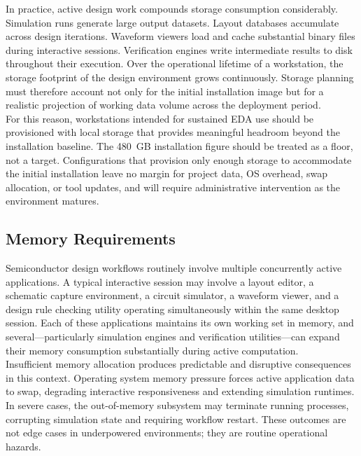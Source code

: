 In practice, active design work compounds storage consumption considerably. Simulation runs
generate large output datasets. Layout databases accumulate across design iterations. Waveform
viewers load and cache substantial binary files during interactive sessions. Verification
engines write intermediate results to disk throughout their execution. Over the operational
lifetime of a workstation, the storage footprint of the design environment grows continuously.
Storage planning must therefore account not only for the initial installation image but for a
realistic projection of working data volume across the deployment period.\\

For this reason, workstations intended for sustained EDA use should be provisioned with local
storage that provides meaningful headroom beyond the installation baseline. The 480~GB
installation figure should be treated as a floor, not a target. Configurations that provision
only enough storage to accommodate the initial installation leave no margin for project data,
OS overhead, swap allocation, or tool updates, and will require administrative intervention as
the environment matures.\\

\subsection{Memory Requirements}

Semiconductor design workflows routinely involve multiple concurrently active applications.
A typical interactive session may involve a layout editor, a schematic capture environment,
a circuit simulator, a waveform viewer, and a design rule checking utility operating
simultaneously within the same desktop session. Each of these applications maintains its own
working set in memory, and several---particularly simulation engines and verification
utilities---can expand their memory consumption substantially during active computation.\\

Insufficient memory allocation produces predictable and disruptive consequences in this
context. Operating system memory pressure forces active application data to swap, degrading
interactive responsiveness and extending simulation runtimes. In severe cases, the out-of-memory
subsystem may terminate running processes, corrupting simulation state and requiring workflow
restart. These outcomes are not edge cases in underpowered environments; they are routine
operational hazards.\\

